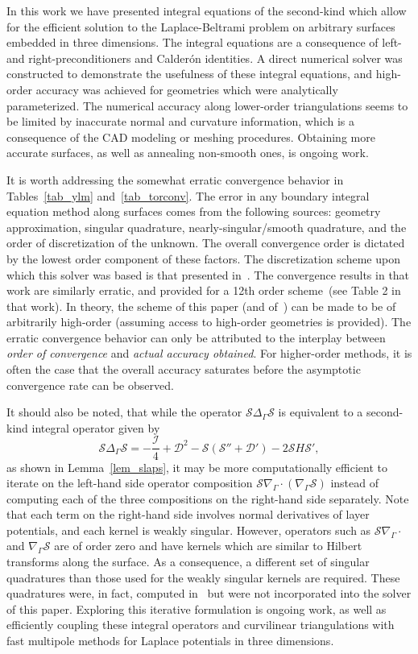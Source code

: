 \documentclass[11pt]{article}
\newcommand{\surfdiv}{\nabla_\Gamma \cdot}
\newcommand{\surfgrad}{\nabla_\Gamma}
\newcommand{\surflap}{\Delta_\Gamma}
\newcommand{\cI}{\mathcal I}
\newcommand{\cS}{\mathcal S}
\newcommand{\cD}{\mathcal D}
\numberwithin{equation}{section}
\begin{document}
In this work we have presented integral equations of the second-kind
which allow for the efficient solution to the Laplace-Beltrami problem
on arbitrary surfaces embedded in three dimensions. The integral
equations are a consequence of left- and right-preconditioners and
Calder\'on identities. A direct numerical solver was constructed to
demonstrate the usefulness of these integral equations, and high-order
accuracy was achieved for geometries which were analytically
parameterized. The numerical accuracy along lower-order triangulations
seems to be limited by inaccurate normal and curvature information,
which is a consequence of the CAD modeling or meshing
procedures. Obtaining more accurate surfaces, as well as annealing
non-smooth ones, is ongoing work.

It is worth addressing the somewhat erratic convergence behavior in
Tables~\ref{tab_ylm} and~\ref{tab_torconv}. The error in
any boundary integral equation method along surfaces comes from the
following sources: geometry approximation, singular quadrature,
nearly-singular/smooth quadrature, and the order of discretization of
the unknown. The overall convergence order is dictated by the lowest
order component of these factors. The discretization scheme upon which
this solver was based is that presented in~\cite{bremer_2012c}. The
convergence results in that work are similarly erratic, and provided
for a 12th order scheme~(see Table 2 in that work).
In theory, the scheme of this paper (and
of~\cite{bremer_2012c}) can be
made to be of arbitrarily high-order (assuming access to high-order
geometries is provided). The erratic convergence behavior
can only be attributed to the interplay between \emph{order of
  convergence} and \emph{actual accuracy obtained}. For higher-order
methods, it is often the case that the overall accuracy saturates
before the asymptotic convergence rate can be observed.

It should also be noted, that while the operator $\cS \surflap \cS$ is
equivalent to a second-kind integral operator given by
\begin{equation}
\cS \surflap \cS = -\frac{\cI}{4} +  \cD^2  - 
\cS(\cS'' + \cD') - 2\cS H \cS'  ,
\end{equation}
as shown in Lemma~\ref{lem_slaps}, it may be more computationally
efficient to iterate on the left-hand side operator composition
$\cS \surfdiv (\surfgrad \cS)$ instead of computing each of the three
compositions on the right-hand side separately.  Note that each term
on the right-hand side involves normal derivatives of layer
potentials, and each kernel is weakly singular. However, operators
such as $\cS \surfdiv$ and $\surfgrad \cS$ are of order zero and
have kernels which are
similar to Hilbert transforms along the surface. As a consequence,
a different set of singular quadratures than those used for the weakly
singular kernels are required.
 These quadratures were, in fact, computed
in~\cite{bremer_2013} but were not incorporated into the solver of
this paper. Exploring this iterative formulation is ongoing work, as well as
efficiently coupling these integral operators and curvilinear
triangulations with fast multipole methods for Laplace potentials in
three dimensions.
\end{document}
